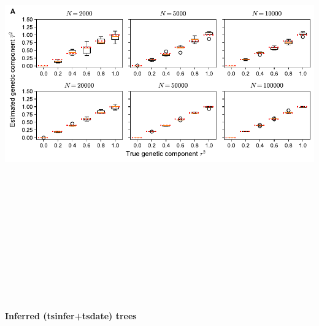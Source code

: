 \documentclass[
  letterpaper,
  DIV=11,
  numbers=noendperiod]{scrartcl}
\begin{document}
\includegraphics[width=\linewidth,height=7.29167in,keepaspectratio]{slides_files/mediabag/imgs/estimation_true.pdf}

\textbf{Inferred (tsinfer+tsdate) trees}
\end{document}
